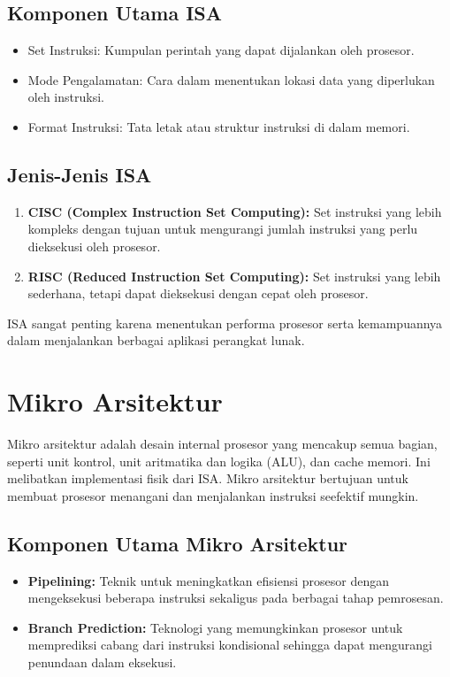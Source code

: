 \documentclass{article}
\begin{document}
\subsection{Komponen Utama ISA}

\begin{itemize}
  \item Set Instruksi: Kumpulan perintah yang dapat dijalankan oleh prosesor.
  \item Mode Pengalamatan: Cara dalam menentukan lokasi data yang diperlukan oleh instruksi.
  \item Format Instruksi: Tata letak atau struktur instruksi di dalam memori.
\end{itemize}

\subsection{Jenis-Jenis ISA}

\begin{enumerate}[label=\arabic*.]
  \item \textbf{CISC (Complex Instruction Set Computing):} Set instruksi yang lebih kompleks dengan tujuan untuk mengurangi jumlah instruksi yang perlu dieksekusi oleh prosesor.
  \item \textbf{RISC (Reduced Instruction Set Computing):} Set instruksi yang lebih sederhana, tetapi dapat dieksekusi dengan cepat oleh prosesor.
\end{enumerate}

ISA sangat penting karena menentukan performa prosesor serta kemampuannya dalam menjalankan berbagai aplikasi perangkat lunak.

\section{Mikro Arsitektur}

Mikro arsitektur adalah desain internal prosesor yang mencakup semua bagian, seperti unit kontrol, unit aritmatika dan logika (ALU), dan cache memori. Ini melibatkan implementasi fisik dari ISA. Mikro arsitektur bertujuan untuk membuat prosesor menangani dan menjalankan instruksi seefektif mungkin.

\subsection{Komponen Utama Mikro Arsitektur}

\begin{itemize}
  \item \textbf{Pipelining:} Teknik untuk meningkatkan efisiensi prosesor dengan mengeksekusi beberapa instruksi sekaligus pada berbagai tahap pemrosesan.

  \item \textbf{Branch Prediction:} Teknologi yang memungkinkan prosesor untuk memprediksi cabang dari instruksi kondisional sehingga dapat mengurangi penundaan dalam eksekusi.
\end{itemize}
\end{document}
